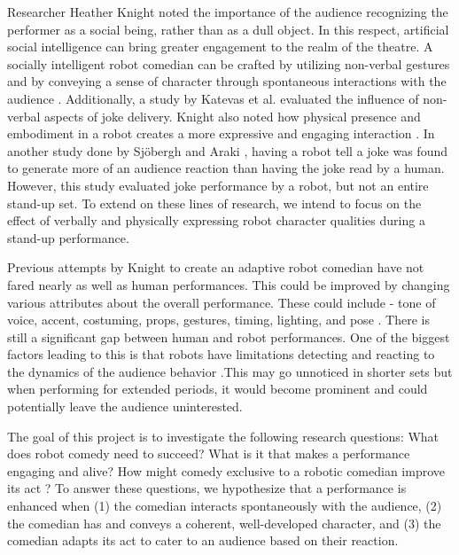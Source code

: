 \documentclass[onecolumn, draftclsnofoot,10pt, compsoc]{IEEEtran}
\begin{document}
Researcher Heather Knight noted the importance of the audience recognizing the performer as a social being, rather than as a dull object. In this respect, artificial social intelligence can bring greater engagement to the realm of the theatre. A socially intelligent robot comedian can be crafted by utilizing non-verbal gestures and by conveying a sense of character through spontaneous interactions with the audience {\cite{KnightEightLessons:2011}}.  Additionally, a study by Katevas et al. {\cite{RobotComedyLab:2015}} evaluated the influence of non-verbal aspects of joke delivery. Knight also noted how physical presence and embodiment in a robot creates a more expressive and engaging interaction {\cite{KnightEightLessons:2011}}. In another study done by Sjöbergh and Araki {\cite{RobotsMakeThings:2008}}, having a robot tell a joke was found to generate more of an audience reaction than having the joke read by a human. However, this study evaluated joke performance by a robot, but not an entire stand-up set. To extend on these lines of research, we intend to focus on the effect of verbally and physically expressing robot character qualities during a stand-up performance. 
 
 Previous attempts by Knight to create an adaptive robot comedian have not fared nearly as well as human performances. This could be improved by changing various attributes about the overall performance. These could include - tone of voice, accent, costuming, props, gestures, timing, lighting, and pose {\cite{KnightSavvy:2011}}. There is still a significant gap between human and robot performances. One of the biggest factors leading to this is that robots have limitations detecting and reacting to the dynamics of the audience behavior {\cite{KatevasRobot:2014}}.This may go unnoticed in shorter sets but when performing for extended periods, it would become prominent and could potentially leave the audience uninterested. 

The goal of this project is to investigate the following research questions: What does robot comedy need to succeed? What is it that makes a performance engaging and alive? How might comedy exclusive to a robotic comedian improve its act {\cite{RobotsMakeThings:2008}}? To answer these questions, we hypothesize that a performance is enhanced when (1) the comedian interacts spontaneously with the audience, (2) the comedian has and conveys a coherent, well-developed character, and (3) the comedian adapts its act to cater to an audience based on their reaction.
\end{document}
